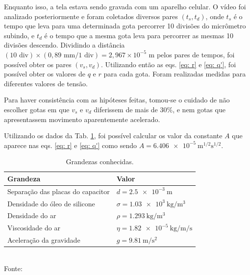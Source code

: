 Enquanto isso, a tela estava sendo gravada com um aparelho celular. 
O vídeo foi analizado posteriormente e foram coletados diversos pares $(t_s, t_d)$, onde $t_s$ é o tempo que leva para 
uma determinada gota percorrer 10 divisões do micrômetro subindo, e $t_d$ é o tempo que a mesma gota leva para percorrer 
as mesmas 10 divisões descendo. Dividindo a distância $(10\text{ div})\times(0,89\text{ mm} / 1 \text{ div}) = 2,967 \times 10^{-5} \text{ m}$ pelos pares de tempos, foi possível obter os pares $(v_s, v_d)$. 
Utilizando então as eqs. \eqref{eq: r} e \eqref{eq: q'}, foi possível obter os valores de $q$ e $r$ para cada gota. Foram realizadas medidas para diferentes valores de tensão.

Para haver consistência com as hipóteses feitas, tomou-se o cuidado de não escolher gotas em que $v_s$ e $v_d$ diferissem de mais de 30$\%$, e nem gotas que apresentassem movimento aparentemente acelerado.  

Utilizando os dados da Tab. \ref{tab: grandezas}, foi possível calcular os valor da constante $A$ que aparece nas eqs. \eqref{eq: r} e \eqref{eq: q'} como sendo $A = \qty{6,406e-5}{\meter\tothe{1/2}\second\tothe{1/2}}$.

\begin{table}[h]
\centering
\caption{Grandezas conhecidas.}
\begin{tabular}{ll}
\toprule\midrule
Grandeza &  Valor \\
\midrule
Separação das placas do capacitor & $d =\qty{2,5e-3}{\meter}$ \\
Densidade do óleo de silicone & $\sigma=\qty{1,03e3}{\kilo\gram\per\meter\tothe 3}$ \\
Densidade do ar & $\rho=\qty{1,293}{\kilo\gram\per\meter\tothe3}$ \\
Viscosidade do ar & $\eta=\qty{1,82e-5}{\kilo\gram\per\meter\per\second}$ \\
Aceleração da gravidade & $g=\qty{9,81}{\meter\per\second\tothe 2}$ \\
\midrule\bottomrule
\end{tabular}
\small{\\Fonte: \cite{phywe}}
\label{tab: grandezas}
\end{table}

